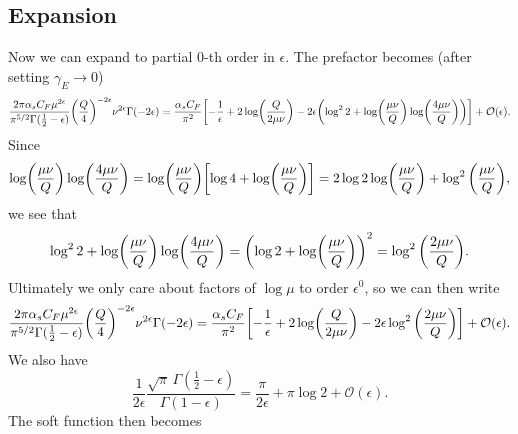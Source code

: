 \documentclass[11pt,twoside,reqno]{amsart}
\theoremstyle{plain}
\theoremstyle{remark}
\theoremstyle{definition}
\theoremstyle{remark}
\theoremstyle{definition}
\theoremstyle{definition}
\newcommand{\cO}{\mathcal{O}}
\begin{document}
\subsection{Expansion}
	Now we can expand to partial $0$-th order in $\epsilon$. The prefactor becomes (after setting $\gamma_E \to 0$)
	\begin{equation}
	\begin{aligned}
		\frac{2\pi\alpha_s C_F\mu^{2\epsilon}}{\pi^{5/2} \Gamma(\frac{1}{2} - \epsilon)}\qty(\frac{Q}{4})^{-2\epsilon} \nu^{2\epsilon} \Gamma(-2\epsilon) = \frac{\alpha_s C_F}{\pi^2}\qty[-\frac{1}{\epsilon} + 2\log(\frac{Q}{2\mu\nu}) - 2\epsilon\qty(\log^2 2 + \log(\frac{\mu\nu}{Q})\log(\frac{4\mu\nu}{Q}))] + \cO(\epsilon).
	\end{aligned}
	\end{equation}
	Since
	\begin{equation}
		\log(\frac{\mu\nu}{Q})\log(\frac{4\mu\nu}{Q}) = \log(\frac{\mu\nu}{Q})\qty[\log 4 + \log(\frac{\mu \nu}{Q})] = 2\log 2 \log(\frac{\mu \nu}{Q}) + \log^2\qty(\frac{\mu\nu}{Q}),
	\end{equation}
	we see that
	\begin{equation}
		\log^2 2 + \log(\frac{\mu\nu}{Q})\log(\frac{4\mu\nu}{Q}) = \qty(\log 2 + \log(\frac{\mu\nu}{Q}))^2 = \log^2\qty(\frac{2\mu\nu}{Q}).
	\end{equation}
	Ultimately we only care about factors of $\log \mu$ to order $\epsilon^0$, so we can then write
	\begin{equation}
		\frac{2\pi\alpha_s C_F\mu^{2\epsilon}}{\pi^{5/2} \Gamma(\frac{1}{2} - \epsilon)}\qty(\frac{Q}{4})^{-2\epsilon} \nu^{2\epsilon} \Gamma(-2\epsilon) = \frac{\alpha_s C_F}{\pi^2}\qty[-\frac{1}{\epsilon} + 2\log(\frac{Q}{2\mu\nu}) - 2\epsilon\log^2\qty(\frac{2\mu\nu}{Q})] + \cO(\epsilon).
	\end{equation}
	We also have
	\begin{equation}
		\frac{1}{2\epsilon}\frac{\sqrt{\pi} \, \Gamma(\frac{1}{2} - \epsilon)}{\Gamma(1 - \epsilon)} = \frac{\pi}{2\epsilon} + \pi \log 2 + \cO(\epsilon).
	\end{equation}
	The soft function then becomes
\end{document}
